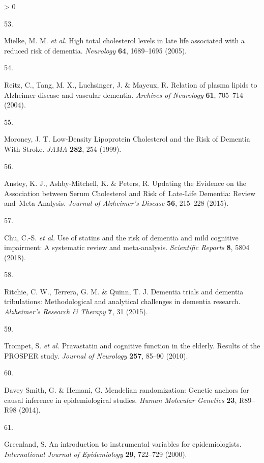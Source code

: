 \documentclass[a4paper, twoside]{templates/ociamthesis}
\newlength{\cslhangindent}
\newlength{\csllabelwidth}
\newenvironment{CSLReferences}[3] %
 {%
  \setlength{\parindent}{0pt}
  \ifodd #1 \everypar{\setlength{\hangindent}{\cslhangindent}}\ignorespaces\fi
  \ifnum #2 > 0
  \setlength{\parskip}{#2\baselineskip}
  \fi
 }%
 {}
\newcommand{\CSLLeftMargin}[1]{\parbox[t]{\maxof{\widthof{#1}}{\csllabelwidth}}{#1}}
\newcommand{\CSLRightInline}[1]{\parbox[t]{\linewidth - \csllabelwidth}{#1}}
\begin{document}
\begin{CSLReferences}{0}{0}
\leavevmode\hypertarget{ref-mielke2005}{}%
\CSLLeftMargin{53. }
\CSLRightInline{Mielke, M. M. \emph{et al.} High total cholesterol levels in late life associated with a reduced risk of dementia. \emph{Neurology} \textbf{64}, 1689--1695 (2005).}

\leavevmode\hypertarget{ref-reitz2004a}{}%
\CSLLeftMargin{54. }
\CSLRightInline{Reitz, C., Tang, M. X., Luchsinger, J. \& Mayeux, R. Relation of plasma lipids to {Alzheimer} disease and vascular dementia. \emph{Archives of Neurology} \textbf{61}, 705--714 (2004).}

\leavevmode\hypertarget{ref-moroney1999}{}%
\CSLLeftMargin{55. }
\CSLRightInline{Moroney, J. T. Low-{Density Lipoprotein Cholesterol} and the {Risk} of {Dementia With Stroke}. \emph{JAMA} \textbf{282}, 254 (1999).}

\leavevmode\hypertarget{ref-anstey2015}{}%
\CSLLeftMargin{56. }
\CSLRightInline{Anstey, K. J., Ashby-Mitchell, K. \& Peters, R. Updating the {Evidence} on the {Association} between {Serum Cholesterol} and {Risk} of~{Late}-{Life Dementia}: Review and~{Meta}-{Analysis}. \emph{Journal of Alzheimer's Disease} \textbf{56}, 215--228 (2015).}

\leavevmode\hypertarget{ref-chu2018}{}%
\CSLLeftMargin{57. }
\CSLRightInline{Chu, C.-S. \emph{et al.} Use of statins and the risk of dementia and mild cognitive impairment: A systematic review and meta-analysis. \emph{Scientific Reports} \textbf{8}, 5804 (2018).}

\leavevmode\hypertarget{ref-ritchie2015}{}%
\CSLLeftMargin{58. }
\CSLRightInline{Ritchie, C. W., Terrera, G. M. \& Quinn, T. J. Dementia trials and dementia tribulations: Methodological and analytical challenges in dementia research. \emph{Alzheimer's Research \& Therapy} \textbf{7}, 31 (2015).}

\leavevmode\hypertarget{ref-trompet2010}{}%
\CSLLeftMargin{59. }
\CSLRightInline{Trompet, S. \emph{et al.} Pravastatin and cognitive function in the elderly. {Results} of the {PROSPER} study. \emph{Journal of Neurology} \textbf{257}, 85--90 (2010).}

\leavevmode\hypertarget{ref-daveysmith2014}{}%
\CSLLeftMargin{60. }
\CSLRightInline{Davey Smith, G. \& Hemani, G. Mendelian randomization: Genetic anchors for causal inference in epidemiological studies. \emph{Human Molecular Genetics} \textbf{23}, R89--R98 (2014).}

\leavevmode\hypertarget{ref-greenland2000}{}%
\CSLLeftMargin{61. }
\CSLRightInline{Greenland, S. An introduction to instrumental variables for epidemiologists. \emph{International Journal of Epidemiology} \textbf{29}, 722--729 (2000).}


\end{CSLReferences}
\end{document}
